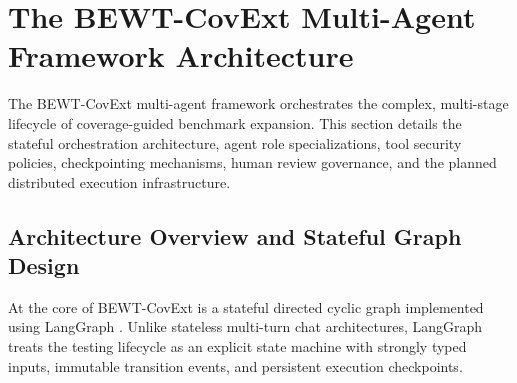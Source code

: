 \documentclass[pdflatex,sn-mathphys-num]{sn-jnl}
\begin{document}
\section{The BEWT-CovExt Multi-Agent Framework Architecture}\label{sec:framework}

The BEWT-CovExt multi-agent framework orchestrates the complex, multi-stage lifecycle of coverage-guided benchmark expansion. This section details the stateful orchestration architecture, agent role specializations, tool security policies, checkpointing mechanisms, human review governance, and the planned distributed execution infrastructure.

\subsection{Architecture Overview and Stateful Graph Design}

At the core of BEWT-CovExt is a stateful directed cyclic graph implemented using LangGraph \cite{langgraph2024}. Unlike stateless multi-turn chat architectures, LangGraph treats the testing lifecycle as an explicit state machine with strongly typed inputs, immutable transition events, and persistent execution checkpoints.
\end{document}
